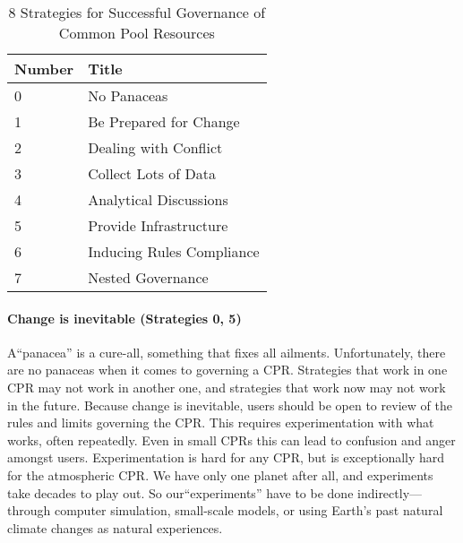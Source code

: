 \begin{table} 
\caption{8 Strategies for Successful Governance of Common Pool Resources}
\label{tab:8 strats}
\centering
\begin{tabular}{@{}ll@{}} \toprule
Number & Title\\ \midrule 
 0 & No Panaceas\\
 1 & Be Prepared for Change\\
 2 & Dealing with Conflict\\
 3 & Collect Lots of Data\\
 4 & Analytical Discussions\\
 5 & Provide Infrastructure\\
 6 & Inducing Rules Compliance\\
 7 & Nested Governance\\ \bottomrule
\end{tabular}
\end{table}

\paragraph{Change is inevitable (Strategies 0, 5)}
A``panacea'' is a cure-all, something that fixes all ailments. Unfortunately, there are no panaceas when it comes to governing a CPR. Strategies that work in one CPR may not work in another one, and strategies that work now may not work in the future. Because change is inevitable, users should be open to review of the rules and limits governing the CPR. This requires experimentation with what works, often repeatedly. Even in small CPRs this can lead to confusion and anger amongst users. Experimentation is hard for any CPR, but is exceptionally hard for the atmospheric CPR. We have only one planet after all, and experiments take decades to play out. So our``experiments'' have to be done indirectly---through computer simulation, small-scale models, or using Earth's past natural climate changes as natural experiences.\\


